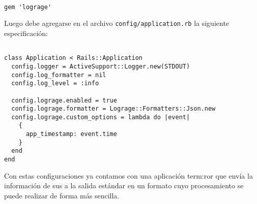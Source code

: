 \begin{lstlisting}

gem 'lograge'

\end{lstlisting}

Luego debe agregarse en el archivo \texttt{config/application.rb} la siguiente
especificación:

\begin{lstlisting}

class Application < Rails::Application
  config.logger = ActiveSupport::Logger.new(STDOUT)
  config.log_formatter = nil
  config.log_level = :info

  config.lograge.enabled = true
  config.lograge.formatter = Lograge::Formatters::Json.new
  config.lograge.custom_options = lambda do |event|
    {
      app_timestamp: event.time
    }
  end
end

\end{lstlisting}

Con estas configuraciones ya contamos con una aplicación \gls{term:ror} que
envía la información de sus  a la salida estándar en un formato cuyo
procesamiento se puede realizar de forma más sencilla.
